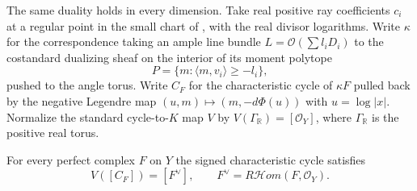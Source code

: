 The same duality holds in every dimension. Take real positive ray coefficients $c_i$ at a regular point in the small chart of \cite[\S3.1]{FZ}, with the real divisor logarithms. Write $\kappa$ for the correspondence taking an ample line bundle $L=\mathcal O(\sum l_iD_i)$ to the costandard dualizing sheaf on the interior of its moment polytope
\[
                P=\{m:\langle m,v_i\rangle\ge -l_i\},
\]
pushed to the angle torus. Write $C_F$ for the characteristic cycle of $\kappa F$ pulled back by the negative Legendre map $(u,m)\mapsto(m,-d\Phi(u))$ with $u=\log|x|$. Normalize the standard cycle-to-$K$ map $V$ by $V(\Gamma_{\mathbb R})=[\mathcal O_Y]$, where $\Gamma_{\mathbb R}$ is the positive real torus.

\begin{proposition}\label{prop:cycleduality}
For every perfect complex $F$ on $Y$ the signed characteristic cycle satisfies
\begin{equation}\label{eq:cycledual}
                  V([C_F])=[F^\vee],\qquad
                  F^\vee=R\mathcal Hom(F,\mathcal O_Y).
\end{equation}
\end{proposition}

